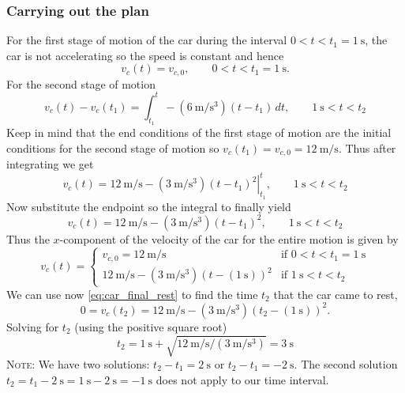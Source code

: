 \documentclass{esg8012exam}
\begin{document}
\begin{solution}
  \subsubsection{Carrying out the plan}
    For the first stage of motion of the car during the interval $0 < t < t_1 = \SI{1}{\second}$, the car is not accelerating so the speed is constant and hence
    $$v_c(t) = v_{c,0},\qquad 0 < t < t_1 = \SI{1}{\second}.$$
    For the second stage of motion
    $$v_c(t) - v_c(t_1) = \int_{t_1}^t -(\SI{6}{\meter\per\second\cubed})(t - t_1)\,dt,\qquad \SI{1}{\second} < t < t_2$$
    Keep in mind that the end conditions of the first stage of motion are the initial conditions for the second stage of motion so $v_c(t_1) = v_{c,0} = \SI{12}{\meter\per\second}$. Thus after integrating we get
    $$v_c(t) = \SI{12}{\meter\per\second} - \left.(\SI{3}{\meter\per\second\cubed})(t - t_1)^2\right|_{t_1}^t,\qquad \SI{1}{\second} < t < t_2$$
    Now substitute the endpoint so the integral to finally yield
    \begin{equation}
      v_c(t) = \SI{12}{\meter\per\second} - (\SI{3}{\meter\per\second\cubed})(t - t_1)^2,\qquad \SI{1}{\second} < t < t_2 \label{eq:car_second_velocity}
    \end{equation}
    Thus the $x$-component of the velocity of the car for the entire motion is given by
    \begin{equation}
      v_c(t) = \begin{cases}
                v_{c,0} = \SI{12}{\meter\per\second} & \text{if }0 < t < t_1 = \SI{1}{\second} \\
                \SI{12}{\meter\per\second} - (\SI{3}{\meter\per\second\cubed})\left(t - (\SI{1}{\second})\right)^2 & \text{if }\SI{1}{\second} < t < t_2
               \end{cases}
    \end{equation}
    We can use now \autoref{eq:car_final_rest} to find the time $t_2$ that the car came to rest,
    $$0 = v_c(t_2) = \SI{12}{\meter\per\second} - (\SI{3}{\meter\per\second\cubed})\left(t_2 - (\SI{1}{\second})\right)^2.$$
    Solving for $t_2$ (using the positive square root)
    \begin{equation}
      t_2 = \SI{1}{\second} + \sqrt{\SI{12}{\meter\per\second} / (\SI{3}{\meter\per\second\cubed})} = \SI{3}{\second}
    \end{equation}
    \textsc{Note}: We have two solutions: $t_2 - t_1 = \SI{2}{\second}$ or $t_2 - t_1 = -\SI{2}{\second}$.  The second solution $t_2 = t_1 - \SI{2}{\second} = \SI{1}{\second} - \SI{2}{\second} = -\SI{1}{\second}$ does not apply to our time interval.
    

\end{solution}
\end{document}
